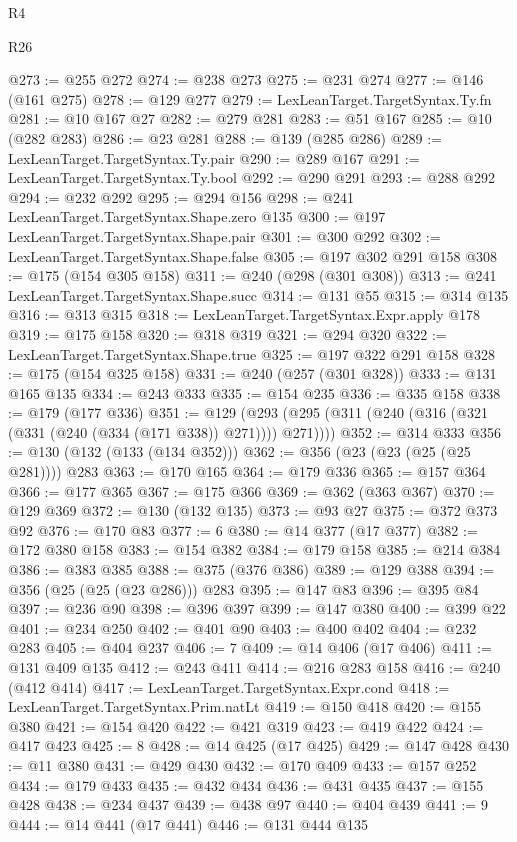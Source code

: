 \begin{lexlean}{R4}
\begin{lexlean}{R26}
\begin{coremodule}
{{{{{{{{{{{{{{{{{{{{{{{{{{{{{{{{{{{{{{{{{{{{{{{{{{{{{{{{{{{{{{{{{{{{{{{{@273 := @255 @272
@274 := @238 @273
@275 := @231 @274
@277 := @146 (@161 @275)
@278 := @129 @277
@279 := LexLeanTarget.TargetSyntax.Ty.fn
@281 := @10 @167 @27
@282 := @279 @281
@283 := @51 @167
@285 := @10 (@282 @283)
@286 := @23 @281
@288 := @139 (@285 @286)
@289 := LexLeanTarget.TargetSyntax.Ty.pair
@290 := @289 @167
@291 := LexLeanTarget.TargetSyntax.Ty.bool
@292 := @290 @291
@293 := @288 @292
@294 := @232 @292
@295 := @294 @156
@298 := @241 LexLeanTarget.TargetSyntax.Shape.zero @135
@300 := @197 LexLeanTarget.TargetSyntax.Shape.pair
@301 := @300 @292
@302 := LexLeanTarget.TargetSyntax.Shape.false
@305 := @197 @302 @291 @158
@308 := @175 (@154 @305 @158)
@311 := @240 (@298 (@301 @308))
@313 := @241 LexLeanTarget.TargetSyntax.Shape.succ
@314 := @131 @55
@315 := @314 @135
@316 := @313 @315
@318 := LexLeanTarget.TargetSyntax.Expr.apply @178
@319 := @175 @158
@320 := @318 @319
@321 := @294 @320
@322 := LexLeanTarget.TargetSyntax.Shape.true
@325 := @197 @322 @291 @158
@328 := @175 (@154 @325 @158)
@331 := @240 (@257 (@301 @328))
@333 := @131 @165 @135
@334 := @243 @333
@335 := @154 @235
@336 := @335 @158
@338 := @179 (@177 @336)
@351 := @129 (@293 (@295 (@311 (@240 (@316 (@321 (@331 (@240 (@334 (@171 @338)) @271)))) @271))))
@352 := @314 @333
@356 := @130 (@132 (@133 (@134 @352)))
@362 := @356 (@23 (@23 (@25 (@25 @281)))) @283
@363 := @170 @165
@364 := @179 @336
@365 := @157 @364
@366 := @177 @365
@367 := @175 @366
@369 := @362 (@363 @367)
@370 := @129 @369
@372 := @130 (@132 @135)
@373 := @93 @27
@375 := @372 @373 @92
@376 := @170 @83
@377 := 6
@380 := @14 @377 (@17 @377)
@382 := @172 @380 @158
@383 := @154 @382
@384 := @179 @158
@385 := @214 @384
@386 := @383 @385
@388 := @375 (@376 @386)
@389 := @129 @388
@394 := @356 (@25 (@25 (@23 @286))) @283
@395 := @147 @83
@396 := @395 @84
@397 := @236 @90
@398 := @396 @397
@399 := @147 @380
@400 := @399 @22
@401 := @234 @250
@402 := @401 @90
@403 := @400 @402
@404 := @232 @283
@405 := @404 @237
@406 := 7
@409 := @14 @406 (@17 @406)
@411 := @131 @409 @135
@412 := @243 @411
@414 := @216 @283 @158
@416 := @240 (@412 @414)
@417 := LexLeanTarget.TargetSyntax.Expr.cond
@418 := LexLeanTarget.TargetSyntax.Prim.natLt
@419 := @150 @418
@420 := @155 @380
@421 := @154 @420
@422 := @421 @319
@423 := @419 @422
@424 := @417 @423
@425 := 8
@428 := @14 @425 (@17 @425)
@429 := @147 @428
@430 := @11 @380
@431 := @429 @430
@432 := @170 @409
@433 := @157 @252
@434 := @179 @433
@435 := @432 @434
@436 := @431 @435
@437 := @155 @428
@438 := @234 @437
@439 := @438 @97
@440 := @404 @439
@441 := 9
@444 := @14 @441 (@17 @441)
@446 := @131 @444 @135
}}}}}}}}}}}}}}}}}}}}}}}}}}}}}}}}}}}}}}}}}}}}}}}}}}}}}}}}}}}}}}}}}}}}}}}}
\end{coremodule}
\end{lexlean}
\end{lexlean}
